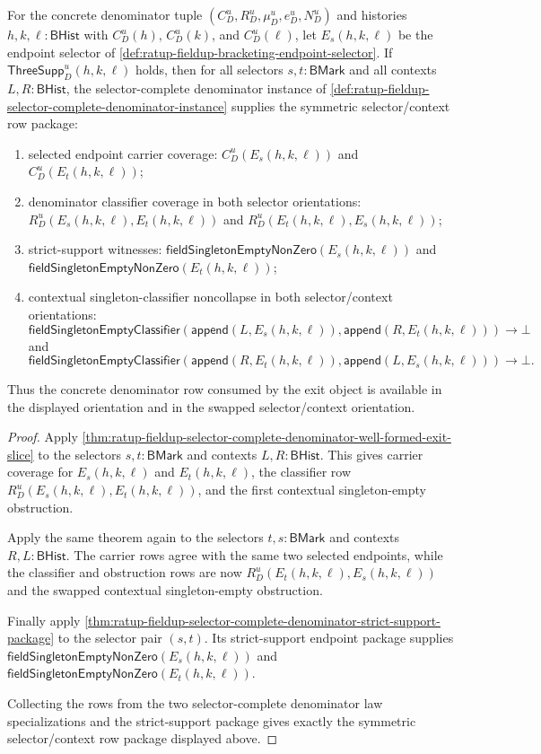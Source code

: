 \begin{theorem}
\label{thm:ratup-fieldup-selector-complete-denominator-swap-package}
For the concrete denominator tuple $(C_D^u,R_D^u,\mu_D^u,e_D^u,N_D^u)$ and
histories $h,k,\ell:\mathsf{BHist}$ with $C_D^u(h)$, $C_D^u(k)$, and
$C_D^u(\ell)$, let $E_s(h,k,\ell)$ be the endpoint selector of
\autoref{def:ratup-fieldup-bracketing-endpoint-selector}. If
$\mathsf{ThreeSupp}_D^u(h,k,\ell)$ holds, then for all selectors
$s,t:\mathsf{BMark}$ and all contexts $L,R:\mathsf{BHist}$, the
selector-complete denominator instance of
\autoref{def:ratup-fieldup-selector-complete-denominator-instance} supplies
the symmetric selector/context row package:
\begin{enumerate}
  \item selected endpoint carrier coverage:
  $C_D^u(E_s(h,k,\ell))$ and $C_D^u(E_t(h,k,\ell))$;
  \item denominator classifier coverage in both selector orientations:
  $R_D^u(E_s(h,k,\ell),E_t(h,k,\ell))$ and
  $R_D^u(E_t(h,k,\ell),E_s(h,k,\ell))$;
  \item strict-support witnesses:
  $\mathsf{fieldSingletonEmptyNonZero}(E_s(h,k,\ell))$ and
  $\mathsf{fieldSingletonEmptyNonZero}(E_t(h,k,\ell))$;
  \item contextual singleton-classifier noncollapse in both
  selector/context orientations:
  $$
  \mathsf{fieldSingletonEmptyClassifier}
  (\mathsf{append}(L,E_s(h,k,\ell)),\mathsf{append}(R,E_t(h,k,\ell)))\to\bot
  $$
  and
  $$
  \mathsf{fieldSingletonEmptyClassifier}
  (\mathsf{append}(R,E_t(h,k,\ell)),\mathsf{append}(L,E_s(h,k,\ell)))\to\bot.
  $$
\end{enumerate}
Thus the concrete denominator row consumed by the exit object is available in
the displayed orientation and in the swapped selector/context orientation.
\end{theorem}
\begin{proof}
Apply
\autoref{thm:ratup-fieldup-selector-complete-denominator-well-formed-exit-slice}
to the selectors $s,t:\mathsf{BMark}$ and contexts $L,R:\mathsf{BHist}$. This
gives carrier coverage for $E_s(h,k,\ell)$ and $E_t(h,k,\ell)$, the classifier
row $R_D^u(E_s(h,k,\ell),E_t(h,k,\ell))$, and the first contextual
singleton-empty obstruction.

Apply the same theorem again to the selectors $t,s:\mathsf{BMark}$ and
contexts $R,L:\mathsf{BHist}$. The carrier rows agree with the same two
selected endpoints, while the classifier and obstruction rows are now
$R_D^u(E_t(h,k,\ell),E_s(h,k,\ell))$ and the swapped contextual
singleton-empty obstruction.

Finally apply
\autoref{thm:ratup-fieldup-selector-complete-denominator-strict-support-package}
to the selector pair $(s,t)$. Its strict-support endpoint package supplies
$\mathsf{fieldSingletonEmptyNonZero}(E_s(h,k,\ell))$ and
$\mathsf{fieldSingletonEmptyNonZero}(E_t(h,k,\ell))$.

Collecting the rows from the two selector-complete denominator law
specializations and the strict-support package gives exactly the symmetric
selector/context row package displayed above.
\end{proof}

